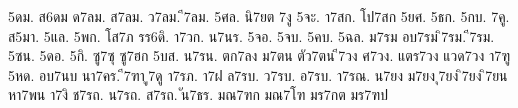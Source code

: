 {5ดม.
ส6ดม
ด7ลม.
ส7ลม.
ว7ลม.
ี7ลม.
5ศล.
นิ7ยต
7งู
5จะ.
า7สก.
โป7สก
5ยศ.
5ธก.
5กบ.
7คู.
ส5มา.
5แล.
5พก.
โส7ภ
รร6ดิ.
า7วก.
น7นร.
5จอ.
5จบ.
5คบ.
5ฉล.
ม7รม
อบ7รม
ิ7รม.
ี7รม.
5ซน.
5ดอ.
5กิ.
ซู7ซุ
ซู7ฮก
5บส.
น7รน.
ตก7ลง
ม7ตน
ตัว7ตน
ี7วง
ศ7วง.
แตร7วง
แวด7วง
า7ฑู
5หด.
อบ7นบ
นา7คร.
ี7ฑา
ู7ดู
า7รภ.
า7ฝ
ล7รบ.
ว7รบ.
อ7รบ.
า7รณ.
น7ยง
ม7ยง
ุ7ยง
ิ7ยง
ิ7ยน
หา7พน
า7งิ
ช7รถ.
น7รถ.
ส7รถ.
ัน7ธร.
มณ7ฑก
มณ7โฑ
มร7กต
มร7ฑป
}
